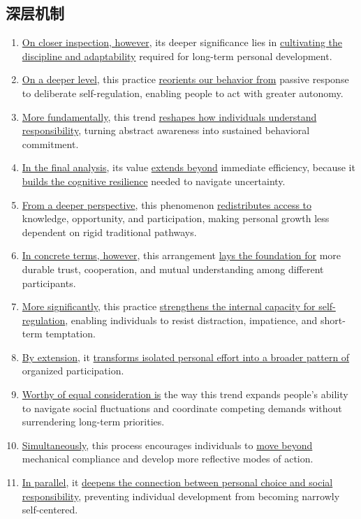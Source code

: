 \subsection{深层机制}

\begin{enumerate}
    \item \underline{On closer inspection, however}, its deeper significance lies in \underline{cultivating the discipline and adaptability} required for long-term personal development.
    \item \underline{On a deeper level}, this practice \underline{reorients our behavior from} passive response to deliberate self-regulation, enabling people to act with greater autonomy.
    \item \underline{More fundamentally}, this trend \underline{reshapes how individuals understand responsibility}, turning abstract awareness into sustained behavioral commitment.
    \item \underline{In the final analysis}, its value \underline{extends beyond} immediate efficiency, because it \underline{builds the cognitive resilience} needed to navigate uncertainty.
    \item \underline{From a deeper perspective}, this phenomenon \underline{redistributes access to} knowledge, opportunity, and participation, making personal growth less dependent on rigid traditional pathways.
    \item \underline{In concrete terms, however}, this arrangement \underline{lays the foundation for} more durable trust, cooperation, and mutual understanding among different participants.
    \item \underline{More significantly}, this practice \underline{strengthens the internal capacity for self-regulation}, enabling individuals to resist distraction, impatience, and short-term temptation.
    \item \underline{By extension}, it \underline{transforms isolated personal effort into a broader pattern of} organized participation.
    \item \underline{Worthy of equal consideration is} the way this trend expands people's ability to navigate social fluctuations and coordinate competing demands without surrendering long-term priorities.
    \item \underline{Simultaneously}, this process encourages individuals to \underline{move beyond} mechanical compliance and develop more reflective modes of action.
    \item \underline{In parallel}, it \underline{deepens the connection between personal choice and social responsibility}, preventing individual development from becoming narrowly self-centered.

\end{enumerate}
